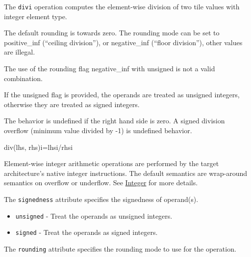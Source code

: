 \documentclass{article}
\begin{document}
The \texttt{divi} operation computes the element-wise division of two tile values with integer element type.


The default rounding is towards zero. The rounding mode can be set to positive\_inf (``ceiling division''), or negative\_inf (``floor division''), other values are illegal.


The use of the rounding flag negative\_inf with unsigned is not a valid combination.


If the unsigned flag is provided, the operands are treated as unsigned integers, otherwise they are treated as signed integers.


The behavior is undefined if the right hand side is zero. A signed division overflow (minimum value divided by -1) is undefined behavior.


div(lhs, rhs)i=lhsi/rhsi

Element-wise integer arithmetic operations are performed by the target architecture's native integer instructions. The default semantics are wrap-around semantics on overflow or underflow. See \href{https://docs.nvidia.com/cuda/tile-ir/latest/sections/operations.html#op-group-integer}{Integer} for more details.


The \texttt{signedness} attribute specifies the signedness of operand(s).


\begin{itemize}
\item \texttt{unsigned} - Treat the operands as unsigned integers.
\item \texttt{signed} - Treat the operands as signed integers.

\end{itemize}
The \texttt{rounding} attribute specifies the rounding mode to use for the operation.
\end{document}

